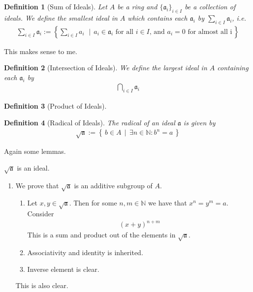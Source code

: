 \documentclass{book}
\theoremstyle{custom_definition}
\newtheorem{definition}{Definition}
\begin{document}
    \begin{definition}[Sum of Ideals]
        Let \(A\) be a ring and \(\{\mathfrak{a}_i\}_{i \in I}\) be a collection of ideals. We define the smallest ideal in \(A\) which contains each \(\mathfrak{a}_i\) by \(\sum_{i \in I} \mathfrak{a}_i\), i.e.
        \begin{align}
            \sum_{i \in I} \mathfrak{a}_i := \left\{ \sum_{i \in I} a_i \, \,\mid\, a_i \in \mathfrak{a}_i \text{ for all \(i \in I\), and \(a_i = 0\) for almost all i}\,\right\}
        \end{align}
    \end{definition}

    This makes sense to me.

    \begin{definition}[Intersection of Ideals]
        We define the largest ideal in \(A\) containing each \(\mathfrak{a}_i\) by
        \begin{align}
            \bigcap_{i \in I} \mathfrak{a}_i
        \end{align}       
    \end{definition}

    \begin{definition}[Product of Ideals]
        
    \end{definition}

    \begin{definition}[Radical of Ideals]
        The radical of an ideal \(\mathfrak{a}\) is given by
        \begin{align}
            \sqrt{\mathfrak{a}} := \left\{\, b \in A \, \mid \, \exists n \in \mathbb{N} : b^n = a \,\right\}
        \end{align}
    \end{definition}

    Again some lemmas.

    \(\sqrt{\mathfrak{a}}\) is an ideal.
    \begin{enumerate}
        \item We prove that \(\sqrt{\mathfrak{a}}\) is an additive subgroup of \(A\).
        \begin{enumerate}
            \item Let \(x, y \in \sqrt{\mathfrak{a}}\). Then for some \(n, m \in \mathbb{N}\) we have that \(x^n = y^m = a\). Consider
            \begin{align}
                (x + y)^{n + m}
            \end{align}
            This is a sum and product out of the elements in \(\sqrt{\mathfrak{a}}\).
            \item Associativity and identity is inherited.
            \item Inverse element is clear.
        \end{enumerate}
        This is also clear.
    \end{enumerate}
\end{document}
